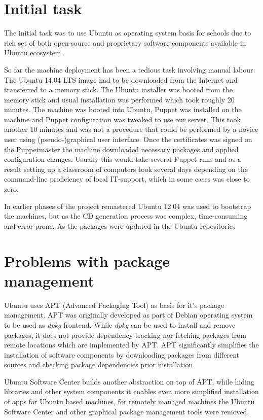 \documentclass[a4paper,11pt]{kth-mag}
\begin{document}
\section{Initial task}

The initial task was to use Ubuntu as operating system basis
for schools due to rich set of both open-source and
proprietary software components available in Ubuntu ecosystem.

So far the machine deployment has been a tedious task involving
manual labour:
The Ubuntu 14.04 LTS image had to be downloaded from the Internet
and transferred to a memory stick.
The Ubuntu installer was booted from the memory stick
and usual installation was performed which took roughly 20 minutes.
The machine was booted into Ubuntu,
Puppet was installed on the machine and Puppet configuration
was tweaked to use our server.
This took another 10 minutes and was not a procedure that could
be performed by a novice user using (pseudo-)graphical user interface.
Once the certificates was signed on the Puppetmaster the
machine downloaded necessary packages and applied configuration
changes.
Usually this would take several Puppet runs and as a result
setting up a classroom of computers took several days
depending on the command-line proficiency of local
IT-support, which in some cases was close to zero.

In earlier phases of the project remastered Ubuntu 12.04
was used to bootstrap the machines, but as the
CD generation process was complex, time-consuming and
error-prone.
As the packages were updated in the Ubuntu repositories


\section{Problems with package management}

Ubuntu uses APT (Advanced Packaging Tool) as basis for
it's package management.
APT was originally developed as part of Debian operating system
to be used as \emph{dpkg} frontend.
While \emph{dpkg} can be used to install and remove packages,
it does not provide dependency tracking nor fetching
packages from remote locations which are implemented by APT.
APT significantly simplifies the installation of software
components by downloading packages from different sources
and checking package dependencies prior installation.

Ubuntu Software Center builds another abstraction on top of APT,
while hiding libraries and other system components it enables
even more simplified installation of apps for Ubuntu based
machines, for remotely managed machines the Ubuntu Software Center
and other graphical package management tools were removed.
\end{document}
